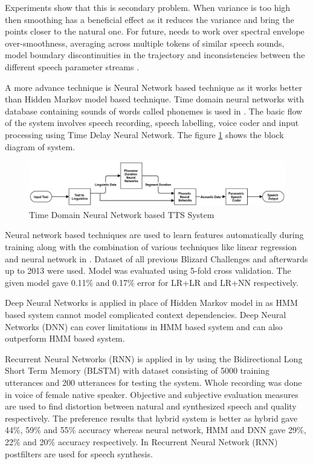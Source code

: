 Experiments show that this is secondary problem. When variance is too high then smoothing has a beneficial effect as it
reduces the variance and bring the points closer to the natural one. For future, needs to work over spectral envelope over-smoothness, averaging across multiple tokens of similar speech sounds, model boundary discontinuities in the trajectory and
inconsistencies between the different speech parameter streams \cite{merritt2013investigating}.

A more advance technique is Neural Network based technique as it works better than Hidden
Markov model based technique. Time domain neural networks with
database containing sounds of words called phonemes is used in \cite{karaali1998text}. The basic flow of the system involves
speech recording, speech labelling, voice coder and input processing using Time Delay Neural
Network. The figure \ref{fig:Time Domain Neural Network based TTS System} shows the block diagram of system.

\begin{center}
	\begin{figure}[hbtp]
		\centering
		\includegraphics[width=\linewidth]{images/time_domain_neural_network.jpg}
		\caption{Time Domain Neural Network based TTS System}
		\label{fig:Time Domain Neural Network based TTS System}
	\end{figure}
		
\end{center}
Neural network based techniques are used to learn features automatically during training along with the combination of various techniques 
like linear regression and neural network in \cite{yoshimura2016hierarchical}. Dataset of all previous Blizard Challenges \cite{blizzard_2009_corpus} and
afterwards up to 2013 were used. Model was evaluated using 5-fold cross validation. The given model gave 0.11\% and 0.17\% error for LR+LR and LR+NN 
respectively.

Deep Neural Networks is applied in place of Hidden Markov model in \cite{ze2013statistical} as HMM
based system cannot model complicated context dependencies. Deep Neural Networks (DNN) can
cover limitations in HMM based system and can also outperform HMM based system. 

Recurrent Neural Networks (RNN) is applied in \cite{fan2014tts} by using the Bidirectional Long
Short Term Memory (BLSTM) with dataset consisting of 5000 training utterances and 200
utterances for testing the system. Whole recording was done in voice of female native speaker.
Objective and subjective evaluation measures are used to find distortion between natural and
synthesized speech and quality respectively. The preference results that hybrid system is better as
hybrid gave 44\%, 59\% and 55\% accuracy whereas neural network, HMM and DNN gave 29\%,
22\% and 20\% accuracy respectively. In \cite{muthukumar2016recurrent} Recurrent Neural Network (RNN) postfilters 
are used for speech synthesis. 

